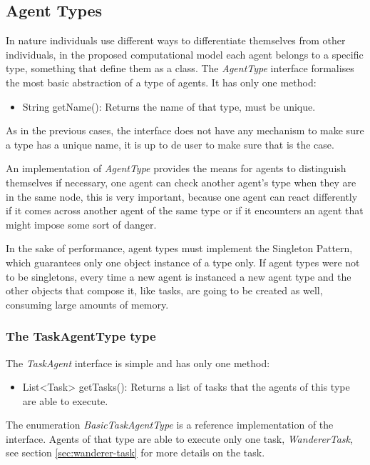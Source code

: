 \subsection{Agent Types}
\label{sec:agent-types}

In nature individuals use different ways to differentiate themselves from other individuals, in the proposed computational model each agent belongs to a specific type, something that define them as a class. The \emph{AgentType} interface formalises the most basic abstraction of a type of agents.  It has only one method:
\begin{itemize}
  \item String getName(): Returns the name of that type, must be unique.
\end{itemize}
As in the previous cases, the interface does not have any mechanism to make sure a type has a unique name, it is up to de user to make sure that is the case.

An implementation of \emph{AgentType} provides the means for agents to distinguish themselves if necessary, one agent can check another agent’s type when they are in the same node, this is very important, because one agent can react differently if it comes across another agent of the same type or if it encounters an agent that might impose some sort of danger.

In the sake of performance, agent types must implement the Singleton Pattern, which guarantees only one object instance of a type only.\cite{bloch2008effective} If agent types were not to be singletons, every time a new agent is instanced a new agent type and the other objects that compose it, like tasks, are going to be created as well, consuming large amounts of memory. 

\subsubsection{The TaskAgentType type}
\label{sec:taskagentype}

The \emph{TaskAgent} interface is simple and has only one method:

\begin{itemize}
  \item List<Task> getTasks(): Returns a list of tasks that the agents of this type are able to execute.
\end{itemize}

The enumeration \emph{BasicTaskAgentType} is a reference implementation of the interface. Agents of that type are able to execute only one task, \emph{WandererTask}, see section \ref{sec:wanderer-task} for more details on the task.

